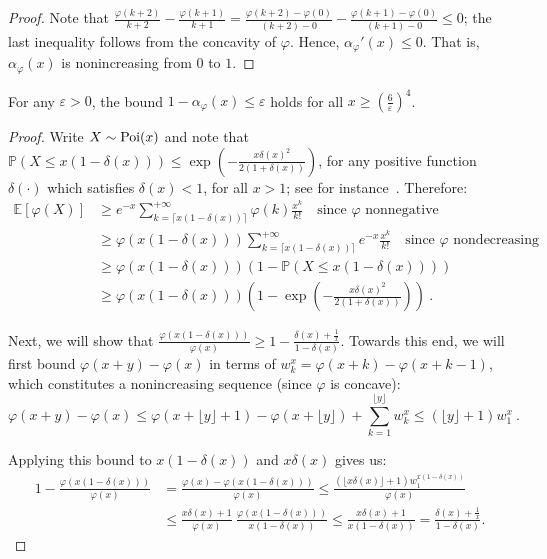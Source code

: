 \begin{proof}
Note that $\frac{\varphi(k+2)}{k+2} - \frac{\varphi(k+1)}{k+1} = \frac{\varphi(k+2) - \varphi(0)}{(k+2)-0} - \frac{\varphi(k+1) - \varphi(0)}{(k+1)-0}  \leq 0$; the last inequality follows from the concavity of $\varphi$. Hence, $\alpha_{\varphi}'(x) \leq 0$. That is, $\alpha_{\varphi}(x)$ is nonincreasing from $0$ to $1$.
\end{proof}

\begin{proposition}
For any $\varepsilon >0$,  the bound $1 - \alpha_{\varphi}(x) \leq \varepsilon$ holds for all $x \geq \left(\frac{6}{\varepsilon}\right)^4$.
\label{prop:ConvergenceRate}
\end{proposition}
\begin{proof}
Write $X \sim \operatorname{\text{Poi}}(x)$ and note that $\mathbb{P}(X \leq x(1-\delta(x))) \leq \exp(-\frac{x\delta(x)^2}{2(1+\delta(x))})$, for any positive function $\delta(\cdot)$ which satisfies $\delta(x) < 1$, for all $x >1$; see for instance~\cite{PoissonBound}. Therefore:
  \begin{equation}
    \begin{aligned}
      \mathbb{E}[\varphi(X)] &\geq  e^{-x}\sum_{k=\lceil x(1-\delta(x)) \rceil}^{+\infty}\varphi(k)\frac{x^k}{k!} \quad \text{since $\varphi$ nonnegative} \\
      &\geq   \varphi(x(1-\delta(x)))\sum_{k=\lceil x(1-\delta(x)) \rceil}^{+\infty}e^{-x}\frac{x^k}{k!}  \quad \text{since $\varphi$ nondecreasing} \\
      &\geq  \varphi(x(1-\delta(x)))(1-\mathbb{P}(X \leq x(1-\delta(x))))\\
      &\geq  \varphi(x(1-\delta(x)))\left(1-\exp(-\frac{x\delta(x)^2}{2(1+\delta(x))})\right)\ .  \label{ineq:exp-soup}
    \end{aligned}
  \end{equation}

Next, we will show that $\frac{\varphi(x(1-\delta(x)))}{\varphi(x)} \geq 1-\frac{\delta(x)+\frac{1}{x}}{1-\delta(x)}$. Towards this end, we will first bound $\varphi(x+y)-\varphi(x)$ in terms of $w^x_k = \varphi(x+k)-\varphi(x+k-1)$, which constitutes a nonincreasing sequence (since $\varphi$ is concave):
    \[ \varphi(x+y) - \varphi(x) \leq \varphi(x+\lfloor y \rfloor + 1)-\varphi(x+\lfloor y \rfloor) + \sum_{k=1}^{\lfloor y \rfloor} w^x_k \leq (\lfloor y \rfloor + 1) w^x_1 \ . \]

    Applying this bound to $x(1-\delta(x))$ and $x\delta(x)$ gives us:   
      \begin{align}
        1 - \frac{\varphi(x(1-\delta(x)))}{\varphi(x)} &=  \frac{\varphi(x)-\varphi(x(1-\delta(x)))}{\varphi(x)} \leq \frac{(\lfloor x\delta(x) \rfloor+1) w^{x(1-\delta(x))}_1}{\varphi(x)} \nonumber \\
        &\leq  \frac{x\delta(x)+1}{\varphi(x)} \ \frac{\varphi(x(1-\delta(x)))}{x(1-\delta(x))} \leq \frac{x\delta(x)+1}{x(1-\delta(x))} = \frac{\delta(x)+\frac{1}{x}}{1-\delta(x)}. \label{ineq:phi-soup}    \end{align}


\end{proof}
